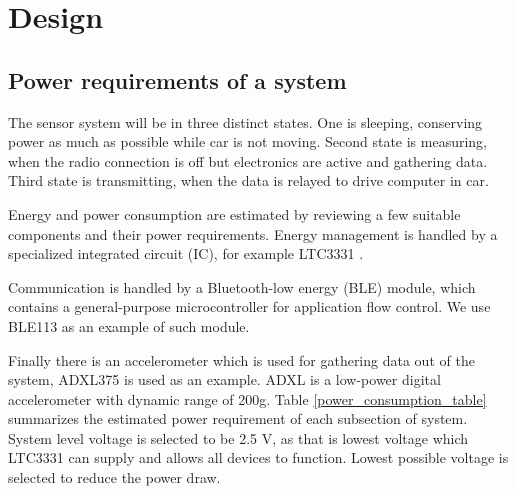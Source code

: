 \section{Design}

\subsection{Power requirements of a system}
The sensor system will be in three distinct states. One is sleeping, conserving power as much as possible while car is not moving.
Second state is measuring, when the radio connection is off but electronics are active and gathering data.
Third state is transmitting, when the data is relayed to drive computer in car.

Energy and power consumption are estimated by reviewing a few suitable components and their power requirements. 
Energy management is handled by a specialized integrated circuit (IC), for example LTC3331 \cite{Technology}.

Communication is handled by a Bluetooth-low energy (BLE) module, which contains a general-purpose microcontroller for application flow control.
We use BLE113 \cite{Bluegiga2013} as an example of such module.

Finally there is an accelerometer which is used for gathering data out of the system, ADXL375 \cite{ADXLDatasheet} is used as an example. ADXL is a low-power digital accelerometer with dynamic range of 200g. Table \ref{power_consumption_table}  summarizes the estimated power requirement of each subsection of system. System level voltage is selected to be 2.5 V, as that is lowest voltage which LTC3331 can supply and allows all devices to function. Lowest possible voltage is selected to reduce the power draw.

\begin{table}[htb]
\caption{\label{power_consumption_table} Current and power consumption of system at different activity levels.}
\begin{center}
\end{center}
\end{table}

